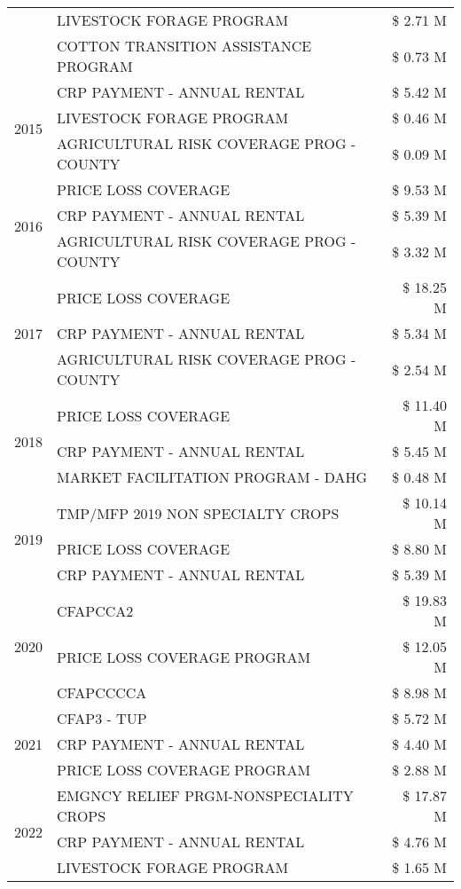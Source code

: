 \begin{tabular}{llr}
 & LIVESTOCK FORAGE PROGRAM & \$ 2.71 M \\
 & COTTON TRANSITION ASSISTANCE PROGRAM & \$ 0.73 M \\
\cline{1-3}
\multirow[t]{3}{*}{2015} & CRP PAYMENT - ANNUAL RENTAL & \$ 5.42 M \\
 & LIVESTOCK FORAGE PROGRAM & \$ 0.46 M \\
 & AGRICULTURAL RISK COVERAGE PROG - COUNTY & \$ 0.09 M \\
\cline{1-3}
\multirow[t]{3}{*}{2016} & PRICE LOSS COVERAGE & \$ 9.53 M \\
 & CRP PAYMENT - ANNUAL RENTAL & \$ 5.39 M \\
 & AGRICULTURAL RISK COVERAGE PROG - COUNTY & \$ 3.32 M \\
\cline{1-3}
\multirow[t]{3}{*}{2017} & PRICE LOSS COVERAGE & \$ 18.25 M \\
 & CRP PAYMENT - ANNUAL RENTAL & \$ 5.34 M \\
 & AGRICULTURAL RISK COVERAGE PROG - COUNTY & \$ 2.54 M \\
\cline{1-3}
\multirow[t]{3}{*}{2018} & PRICE LOSS COVERAGE & \$ 11.40 M \\
 & CRP PAYMENT - ANNUAL RENTAL & \$ 5.45 M \\
 & MARKET FACILITATION PROGRAM - DAHG & \$ 0.48 M \\
\cline{1-3}
\multirow[t]{3}{*}{2019} & TMP/MFP 2019 NON SPECIALTY CROPS & \$ 10.14 M \\
 & PRICE LOSS COVERAGE & \$ 8.80 M \\
 & CRP PAYMENT - ANNUAL RENTAL & \$ 5.39 M \\
\cline{1-3}
\multirow[t]{3}{*}{2020} & CFAPCCA2 & \$ 19.83 M \\
 & PRICE LOSS COVERAGE PROGRAM & \$ 12.05 M \\
 & CFAPCCCCA & \$ 8.98 M \\
\cline{1-3}
\multirow[t]{3}{*}{2021} & CFAP3 - TUP & \$ 5.72 M \\
 & CRP PAYMENT - ANNUAL RENTAL & \$ 4.40 M \\
 & PRICE LOSS COVERAGE PROGRAM & \$ 2.88 M \\
\cline{1-3}
\multirow[t]{3}{*}{2022} & EMGNCY RELIEF PRGM-NONSPECIALITY CROPS & \$ 17.87 M \\
 & CRP PAYMENT - ANNUAL RENTAL & \$ 4.76 M \\
 & LIVESTOCK FORAGE PROGRAM & \$ 1.65 M \\
\cline{1-3}
\bottomrule
\end{tabular}
